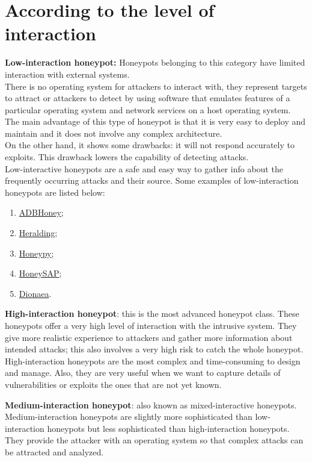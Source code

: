 \section{According to the level of interaction}
 \textbf{Low-interaction honeypot:}
Honeypots belonging to this category have limited interaction with external systems.\\
There is no operating system for attackers to interact with, they represent targets to attract or attackers to detect by using software that emulates features of a particular operating system and network services on a host operating system.\\
The main advantage of this type of honeypot is that it is very easy to deploy and maintain and it does not involve any complex architecture. \\
On the other hand, it shows some drawbacks: it will not respond accurately to exploits. This drawback lowers the capability of detecting attacks.\\
Low-interactive honeypots are a safe and easy way to gather info about the frequently occurring attacks and their source.
Some examples of low-interaction honeypots are listed below:
\begin{enumerate}
    \item \href{https://github.com/huuck/ADBHoney}{ADBHoney};
    \item \href{https://github.com/johnnykv/heralding}{Heralding};
    \item \href{https://github.com/foospidy/HoneyPy}{Honeypy};
    \item \href{https://github.com/SecureAuthCorp/HoneySAP}{HoneySAP};
    \item \href{https://github.com/DinoTools/dionaea}{Dionaea}.
\end{enumerate}
\textbf{High-interaction honeypot}: this is the most advanced honeypot class.
These honeypots offer a very high level of interaction with the intrusive system. They give more realistic experience to attackers and gather more information about intended attacks; this also involves a very high risk to catch the whole honeypot.\\
High-interaction honeypots are the most complex and time-consuming to design and manage. Also, they are very useful when we want to capture details of vulnerabilities or exploits the ones that are not yet known.

\textbf{Medium-interaction honeypot}: also known as mixed-interactive honeypots. \\
Medium-interaction honeypots are slightly more sophisticated than low-interaction honeypots but less sophisticated than high-interaction honeypots. They provide the attacker with an operating system so that complex attacks can be attracted and analyzed.

